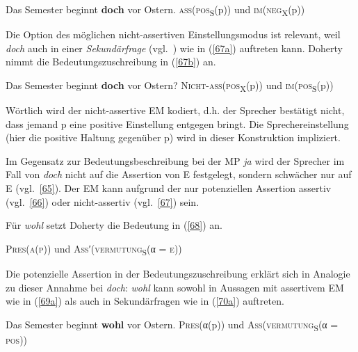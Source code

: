 \begin{exe}
	\ex\label{66} 
		\begin{xlist}	
			\ex\label{66a} Das Semester beginnt \textbf{doch} vor Ostern.
			\ex\label{66b} \textsc{ass(pos}\textsubscript{S}(p)) und \textsc{im(neg}\textsubscript{X}(p))
		\end{xlist}
\end{exe}
Die Option des möglichen nicht-assertiven Einstellungsmodus ist relevant, weil \textit{doch} auch in einer \textit{Sekundärfrage} (vgl.\ \citealt[68]{Doherty1985}) wie in (\ref{67a}) auftreten kann. Doherty nimmt die Bedeutungszuschreibung in (\ref{67b}) an.
\begin{exe}
	\ex\label{67} 
		\begin{xlist}	
			\ex\label{67a} Das Semester beginnt \textbf{doch} vor Ostern?
			\ex\label{67b} \textsc{Nicht-ass(pos}\textsubscript{X}(p)) und \textsc{im(pos}\textsubscript{S}(p))
		\end{xlist}
\end{exe}
Wörtlich wird der nicht-assertive EM kodiert, d.h. der Sprecher bestätigt nicht, dass jemand p eine positive Einstellung entgegen bringt. Die Sprecher\-einstellung (hier die positive Haltung gegenüber p) wird in dieser Konstruktion impliziert. 

Im Gegensatz zur Bedeutungsbeschreibung bei der MP \textit{ja} wird der Sprecher im Fall von \textit{doch} nicht auf die Assertion von E festgelegt, sondern schwächer nur auf E (vgl.\ \ref{65}). Der EM kann aufgrund der nur potenziellen Assertion assertiv (vgl.\ \ref{66}) oder nicht-assertiv (vgl.\ \ref{67}) sein.

Für \textit{wohl} setzt Doherty die Bedeutung in (\ref{68}) an.

\begin{exe}
	\ex\label{68} 
	\textsc{Pres(α(p))} und \textsc{Ass′}(\textsc{vermutung}\textsubscript{S}(α = \textsc{e}))
	\hfill\hbox{\citet[82]{Doherty1985}}
\end{exe}
Die potenzielle Assertion in der Bedeutungszuschreibung erklärt sich in Analogie zu dieser Annahme bei \textit{doch}: \textit{wohl} kann sowohl in Aussagen mit assertivem EM wie in (\ref{69a}) als auch in Sekundärfragen wie in (\ref{70a}) auftreten.

\begin{exe}
	\ex\label{69} 
		\begin{xlist}	
			\ex\label{69a} Das Semester beginnt \textbf{wohl} vor Ostern.
			\ex\label{69b} \textsc{Pres}(α(p)) und \textsc{Ass}(\textsc{vermutung}\textsubscript{S}(α = \textsc{pos}))
		\end{xlist}
\end{exe}

